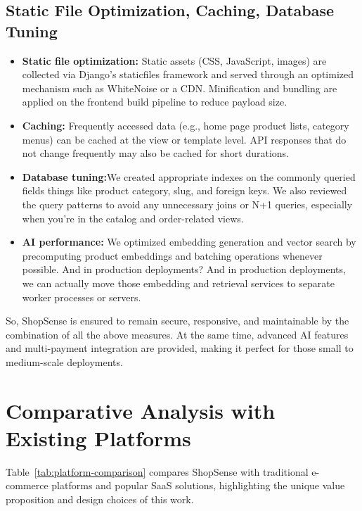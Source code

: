 \subsection{Static File Optimization, Caching, Database Tuning}
\begin{itemize}
  \item \textbf{Static file optimization:} Static assets (CSS, JavaScript, images) are collected via Django’s staticfiles framework and served through an optimized mechanism such as WhiteNoise or a CDN. Minification and bundling are applied on the frontend build pipeline to reduce payload size.
  \item \textbf{Caching:} Frequently accessed data (e.g., home page product lists, category menus) can be cached at the view or template level. API responses that do not change frequently may also be cached for short durations.
  \item \textbf{Database tuning:}We created appropriate indexes on the commonly queried fields things like product category, slug, and foreign keys. We also reviewed the query patterns to avoid any unnecessary joins or N+1 queries, especially when you're in the catalog and order-related views.
  \item \textbf{AI performance:} We optimized embedding generation and vector search by precomputing product embeddings and batching operations whenever possible. And in production deployments? And in production deployments, we can actually move those embedding and retrieval services to separate worker processes or servers.
\end{itemize}

So, ShopSense is ensured to remain secure, responsive, and maintainable by the combination of all the above measures. At the same time, advanced AI features and multi-payment integration are provided, making it perfect for those small to medium-scale deployments.


\section{Comparative Analysis with Existing Platforms}
Table~\ref{tab:platform-comparison} compares ShopSense with traditional e-commerce platforms and popular SaaS solutions, highlighting the unique value proposition and design choices of this work.

